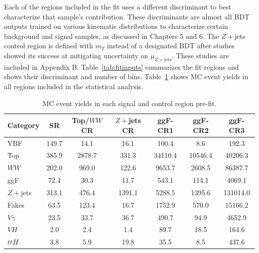 Each of the regions included in the fit uses a different discriminant to best characterize that sample's contribution. These discriminants are almost all BDT outputs trained on various kinematic distributions to characterize certain background and signal samples, as discussed in Chapters 5 and 6. The $Z+$jets control region is defined with $m_T$ instead of a designated BDT after studies showed its success at mitigating uncertainty on $\mu_{Z+\text{jets}}$. These studies are included in Appendix B. Table~\ref{tab:fitinputs} summarizes the fit regions and shows their discriminant and number of bins. Table~\ref{tab:cryields} shows MC event yields in all regions included in the statistical analysis. 
\begin{table}[!h]
  \begin{center}
    \caption{Fit categories, including SR and CRs, distributions and number of bins used in the fit.}
    \label{tab:fitinputs}
  \end{center}
\end{table}

\begin{table}[!h]
  \begin{center}
    \begin{tabular}{l|cccccc}
      Category         & SR    & Top/$WW$ CR   & $Z+$jets CR           & ggF-CR1               & ggF-CR2       & ggF-CR3 \\
      \hline
      \hline
      VBF      & 149.7 & 14.1 & 16.1 & 100.4 & 8.6 & 192.3 \\
      Top    &  385.9 & 2878.7 & 331.3 & 34110.4 & 10546.4 & 40206.3 \\
      $WW$ & 202.0 & 969.0 & 122.6 & 9653.7 & 2608.5 & 86387.7 \\
      ggF & 72.4 & 30.3 & 11.7 & 543.1 & 114.1 & 4069.1 \\
      $Z+$jets & 313.1 & 476.4 & 1391.1 & 5288.5 & 1395.6 & 131014.0 \\
      Fakes & 63.5 & 123.4 & 16.7 & 1752.9 & 570.0 & 15166.2 \\
      $V\gamma$ & 23.5 & 33.7 & 36.7 & 490.7 & 94.9 & 4652.9 \\
      $VH$ & 2.0 & 2.4 & 1.4 & 89.7 & 18.5 & 164.6 \\
      $ttH$ &  3.8 &  5.9 &  19.8 & 35.5 & 8.5 & 437.6 \\
      \hline
    \end{tabular}
    \caption{MC event yields in each signal and control region pre-fit.}
    \label{tab:cryields}
  \end{center}
\end{table}

